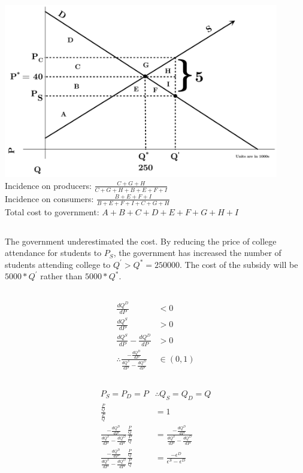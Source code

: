\documentclass{article}
\begin{document}
	\subsection[b]{}
		\includegraphics[height=3in]{Charts/2b} \\
		Incidence on producers: $\frac{C+G+H}{C+G+H+B+E+F+I}$\\
		Incidence on consumers: $\frac{B+E+F+I}{B+E+F+I+C+G+H}$ \\
		Total cost to government: $A+B+C+D+E+F+G+H+I$
	\subsection[c]{}
		The government underestimated the cost. By reducing the price of college attendance for students to $P_S$, the government has increased the number of students attending college to $Q^{'} > Q^{*} = 250000.$ The cost of the subsidy will be $5000*Q^{'}$ rather than 	$5000*Q^{*}$.
	\subsection[d]{}
		\begin{align}
			\frac{dQ^D}{dP} &< 0 \\
			\frac{dQ^S}{dP} &> 0 \\
			\frac{dQ^S}{dP} - \frac{dQ^D}{dP} &> 0 \\
			\therefore \frac{-\frac{dQ^D}{dP}}{\frac{dQ^S}{dP} - \frac{dQ^D}{dP}} &\in (0,1)
		\end{align}
	\subsection[e]{}
		\setcounter{equation}{0}
		\begin{align}
			P_S = P_D = P &\therefore Q_S = Q_D = Q\\
			\frac{\frac{P}{Q}}{\frac{P}{Q}} &= 1\\
			\frac{-\frac{dQ^D}{dP}}{\frac{dQ^S}{dP} - \frac{dQ^D}{dP}} \frac{\frac{P}{Q}}{\frac{P}{Q}} &= \frac{-\frac{dQ^D}{dP}}{\frac{dQ^S}{dP} - \frac{dQ^D}{dP}}\\
			\frac{-\frac{dQ^D}{dP}}{\frac{dQ^S}{dP} - \frac{dQ^D}{dP}} \frac{\frac{P}{Q}}{\frac{P}{Q}} &=\frac{-\epsilon^D}{\epsilon^S - \epsilon^D}
		\end{align}
\end{document}
